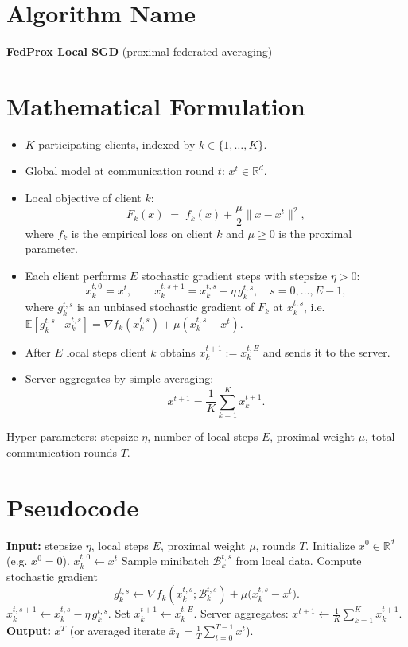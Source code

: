 \documentclass[11pt]{article}
\begin{document}
\section*{Algorithm Name}
\textbf{FedProx Local SGD} (proximal federated averaging)

\section*{Mathematical Formulation}
\noindent
\begin{itemize}
    \item $K$ participating clients, indexed by $k\in\{1,\dots,K\}$.
    \item Global model at communication round $t$: $x^{t}\in\mathbb{R}^{d}$.
    \item Local objective of client $k$:
    \[
        F_k(x)\;=\;f_k(x)+\frac{\mu}{2}\|x-x^{t}\|^{2},
    \]
    where $f_k$ is the empirical loss on client $k$ and $\mu\ge 0$ is the proximal parameter.
    \item Each client performs $E$ stochastic gradient steps with stepsize $\eta>0$:
    \[
        x_{k}^{t,0}=x^{t},\qquad
        x_{k}^{t,s+1}=x_{k}^{t,s}-\eta\,g_{k}^{t,s},
        \quad s=0,\dots,E-1,
    \]
    where $g_{k}^{t,s}$ is an unbiased stochastic gradient of $F_k$ at $x_{k}^{t,s}$, i.e.
    $\mathbb{E}[g_{k}^{t,s}\mid x_{k}^{t,s}]=\nabla f_k(x_{k}^{t,s})+\mu (x_{k}^{t,s}-x^{t})$.
    \item After $E$ local steps client $k$ obtains $x_{k}^{t+1}:=x_{k}^{t,E}$ and sends it to the server.
    \item Server aggregates by simple averaging:
    \[
        x^{t+1}= \frac{1}{K}\sum_{k=1}^{K}x_{k}^{t+1}.
    \]
\end{itemize}
Hyper‑parameters: stepsize $\eta$, number of local steps $E$, proximal weight $\mu$, total communication rounds $T$.

\section*{Pseudocode}
\begin{algorithm}[H]
\caption{FedProx Local SGD}
\begin{algorithmic}[1]
\STATE \textbf{Input:} stepsize $\eta$, local steps $E$, proximal weight $\mu$, rounds $T$.
\STATE Initialize $x^{0}\in\mathbb{R}^{d}$ (e.g. $x^{0}=0$).
        \STATE $x_{k}^{t,0}\leftarrow x^{t}$
            \STATE Sample minibatch $\mathcal{B}_{k}^{t,s}$ from local data.
            \STATE Compute stochastic gradient
            \[
                g_{k}^{t,s}\gets \nabla f_k(x_{k}^{t,s};\mathcal{B}_{k}^{t,s})+\mu\bigl(x_{k}^{t,s}-x^{t}\bigr).
            \]
            \STATE $x_{k}^{t,s+1}\leftarrow x_{k}^{t,s}-\eta\, g_{k}^{t,s}$.
        \ENDFOR
        \STATE Set $x_{k}^{t+1}\leftarrow x_{k}^{t,E}$.
    \ENDFOR
    \STATE Server aggregates: $x^{t+1}\leftarrow \frac{1}{K}\sum_{k=1}^{K}x_{k}^{t+1}$.
\ENDFOR
\STATE \textbf{Output:} $x^{T}$ (or averaged iterate $\bar{x}_T=\frac{1}{T}\sum_{t=0}^{T-1}x^{t}$).
\end{algorithmic}
\end{algorithm}
\end{document}
